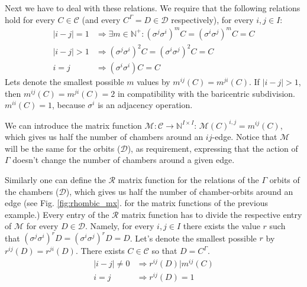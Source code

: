 \documentclass[12pt,a4paper]{article}
\numberwithin{equation}{section}
\theoremstyle{plain}%
\theoremstyle{definition}
\theoremstyle{remark}
\newtheorem*{note}{Note}
\begin{document}

Next we have to deal with these relations. We require that the following
relations hold for every $C\in\mathcal{C}$ (and every $C^\Gamma=D\in\mathcal{D}$
respectively), for every $i,j\in I$:
\begin{align}
  \label{eqn:mxfun_constraint_begin}|i-j|=1 & \Rightarrow \exists m\in\mathbb{N}^+: (\sigma^j\sigma^i)^mC=(\sigma^i\sigma^j)^mC=C \\
  |i-j|>1 & \Rightarrow (\sigma^j\sigma^i)^2C=(\sigma^i\sigma^j)^2C=C \\
  i=j & \Rightarrow (\sigma^i\sigma^i)C=C
\end{align}
Lets denote the smallest possible $m$ values by $m^{ij}(C)=m^{ji}(C)$.
If $|i-j|>1$, then $m^{ij}(C)=m^{ji}(C)=2$ in compatibility with the baricentric subdivision.  
$m^{ii}(C)=1$, because $\sigma^i$ is an adjacency operation.

We can introduce the matrix function $\mathcal{M}: \mathcal{C}
\rightarrow \mathbb{N}^{I\times I}$: $\mathcal{M}(C)^{i,j}=m^{ij}(C)$, which
gives us half the number of chambers around an $ij$-edge. Notice that $\mathcal{M}$
will be the same for the orbits ($\mathcal{D}$), as requirement, expressing that
the action of $\Gamma$ doesn't change the number of chambers around a given
edge.

Similarly one can define the $\mathcal{R}$ matrix function for the
relations of the $\Gamma$ orbits of the chambers ($\mathcal{D}$), which gives us
half the number of chamber-orbits around an edge (see Fig. \ref{fig:rhombic_mx}.
for the matrix functions of the previous example.) Every entry of the $\mathcal{R}$
matrix function has to divide the respective entry of $\mathcal{M}$ for
every $D\in\mathcal{D}$. Namely, for every $i,j\in I$ there exists the value $r$ such that
$(\sigma^j\sigma^i)^rD=(\sigma^i\sigma^j)^rD=D$. Let's denote the smallest
possible $r$ by $r^{ij}(D)=r^{ji}(D)$. There exists $C\in\mathcal{C}$ so
that $D=C^\Gamma$.
\begin{align}
  |i-j|\ne0 & \Rightarrow r^{ij}(D)|m^{ij}(C) \\
  \label{eqn:mxfun_constraint_end}i=j & \Rightarrow r^{ij}(D)=1
\end{align}
\end{document}
